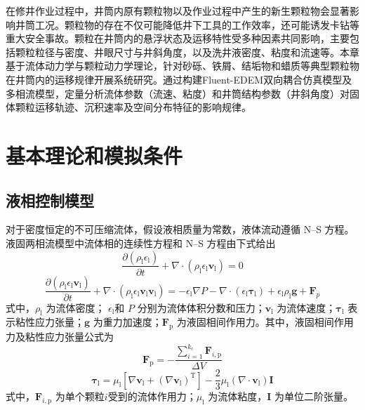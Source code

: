 
\label{keliyunyi}
在修井作业过程中，井筒内原有颗粒物以及作业过程中产生的新生颗粒物会显著影响井筒工况。颗粒物的存在不仅可能降低井下工具的工作效率，还可能诱发卡钻等重大安全事故。颗粒在井筒内的悬浮状态及运移特性受多种因素共同影响，主要包括颗粒粒径与密度、井眼尺寸与井斜角度，以及洗井液密度、粘度和流速等。本章基于流体动力学与颗粒动力学理论，针对砂砾、铁屑、结垢物和蜡质等典型颗粒物在井筒内的运移规律开展系统研究。通过构建Fluent-EDEM双向耦合仿真模型及多相流模型，定量分析流体参数（流速、粘度）和井筒结构参数（井斜角度）对固体颗粒运移轨迹、沉积速率及空间分布特征的影响规律。 

\section{基本理论和模拟条件}  

\subsection{液相控制模型}

对于密度恒定的不可压缩流体，假设液相质量为常数，液体流动遵循 N--S 方程。液固两相流模型中流体相的连续性方程和 N--S 方程由下式给出
\begin{equation}
	\frac{\partial(\rho_{\mathrm{l}}\epsilon_{\mathrm{l}})}{\partial t}
	+\nabla\cdot(\rho_{\mathrm{l}}\epsilon_{\mathrm{l}}\bm{v}_{\mathrm{l}})=0
\end{equation}
\begin{equation}
	\frac{\partial(\rho_{\mathrm{l}}\epsilon_{\mathrm{l}}\bm{v}_{\mathrm{l}})}{\partial t}
	+\nabla\cdot(\rho_{\mathrm{l}}\epsilon_{\mathrm{l}}\bm{v}_{\mathrm{l}}\bm{v}_{\mathrm{l}})
	=-\epsilon_{\mathrm{l}}\nabla P
	-\nabla\cdot(\epsilon_{\mathrm{l}}\bm{\tau}_{\mathrm{l}})
	+\epsilon_{\mathrm{l}}\rho_{\mathrm{l}}\bm{g}+\bm{F}_{p}
\end{equation}
式中，\(\rho_{\mathrm{l}}\) 为流体密度； \(\epsilon_{\mathrm{l}}\)和 \(P\) 分别为流体体积分数和压力；\(\bm{v}_{\mathrm{l}}\) 为流体速度；\(\bm{\tau}_{\mathrm{l}}\) 表示粘性应力张量；\(\bm{g}\) 为重力加速度；\(\bm{F}_{\mathrm{p}}\) 为液固相间作用力。其中，液固相间作用力及粘性应力张量公式为
\begin{equation}
	\bm{F}_{\mathrm{p}}
	=-\frac{\sum_{i=1}^{k_{\mathrm{c}}}\bm{F}_{i,\mathrm{p}}}{\Delta V}
\end{equation}
\begin{equation}
	\bm{\tau}_{\mathrm{l}}
	=\mu_{\mathrm{l}}\left[
	\nabla\bm{v}_{\mathrm{l}}
	+\left(\nabla\bm{v}_{\mathrm{l}}\right)^{\mathrm{T}}
	\right]
	-\frac{2}{3}\mu_{\mathrm{l}}
	\left(\nabla\cdot\bm{v}_{\mathrm{l}}\right)\bm{I}
\end{equation}
式中，\(\bm{F}_{i,\mathrm{p}}\) 为单个颗粒\(i\)受到的流体作用力；\(\mu_{\mathrm{l}}\) 为流体粘度，\(\bm{I}\) 为单位二阶张量。

